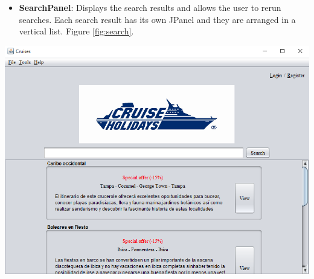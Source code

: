 \documentclass[11pt]{article}
\begin{document}
	\begin{qn}
		\begin{itemize}
	   	    \item \textbf{SearchPanel}: Displays the search results and allows the user to rerun searches. Each search result has its own JPanel and they are arranged in a vertical list. Figure \ref{fig:search}.
	   	\end{itemize}
	   	\begin{center}
			\begin{minipage}{0.8\linewidth}
				\includegraphics[width=\linewidth]{images/search.png}
				\label{fig:search}
			\end{minipage}
	    \end{center}
	\end{qn}
	
\end{document}
